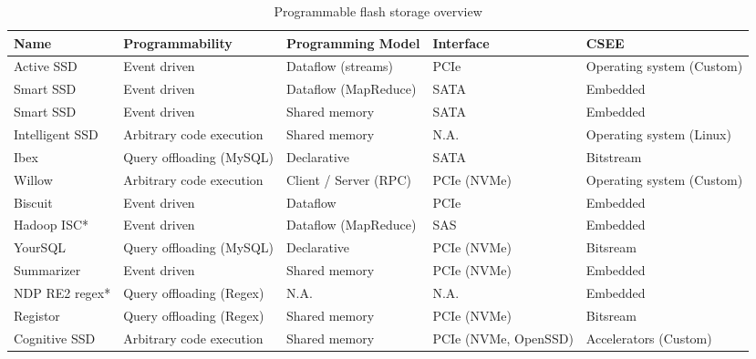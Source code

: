 \begin{table}[H]
    \caption{Programmable flash storage overview}
    \centering
    \begin{adjustbox}{width=1\textwidth}
        \begin{threeparttable}[]
            \begin{tabular}{lllll}
                \toprule
                \textbf{Name} & \textbf{Programmability} & \textbf{Programming Model} & \textbf{Interface} & \textbf{CSEE} \\
                \midrule
                Active SSD \cite{6062973} & Event driven & Dataflow (streams) & PCIe & Operating system (Custom) \\
                Smart SSD \cite{6558444} & Event driven & Dataflow (MapReduce) & SATA & Embedded \\
                Smart SSD \cite{10.1145/2463676.2465295} & Event driven & Shared memory & SATA & Embedded \\
                Intelligent SSD \cite{10.1145/2464996.2465003, 10.1145/2505515.2507847} & Arbitrary code execution\footnotemark[7] & Shared memory\footnotemark[7] & N.A. & Operating system (Linux)\footnotemark[7] \\
                Ibex \cite{10.14778/2732967.2732972} & Query offloading (MySQL) & Declarative & SATA & Bitstream \\
                Willow \cite{186149} & Arbitrary code execution & Client / Server (RPC) & PCIe (NVMe) & Operating system (Custom) \\
                Biscuit \cite{2016-isca-biscuit} & Event driven & Dataflow & PCIe & Embedded \\
                Hadoop ISC* \cite{7524716} & Event driven & Dataflow (MapReduce) & SAS & Embedded \\
                YourSQL \cite{10.14778/2994509.2994512} & Query offloading (MySQL) & Declarative & PCIe (NVMe) & Bitsream\footnotemark[8] \\
                Summarizer \cite{10.1145/3123939.3124553} & Event driven & Shared memory & PCIe (NVMe) & Embedded \\
                NDP RE2 regex* \cite{10.1145/3211922.3211926} & Query offloading (Regex) & N.A. & N.A. & Embedded \\
                Registor \cite{10.1145/3310149} & Query offloading (Regex) & Shared memory & PCIe (NVMe) & Bitsream \\
                Cognitive SSD \cite{8839401} & Arbitrary code execution & Shared memory & PCIe (NVMe, OpenSSD) & Accelerators (Custom) \\

\end{tabular}
\end{threeparttable}
\end{adjustbox}
\end{table}
